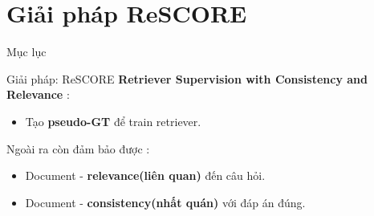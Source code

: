 \documentclass{beamer}
\begin{document}


\section{Giải pháp ReSCORE}
\begin{frame}{Mục lục}
    \tableofcontents[currentsection]
\end{frame}

\begin{frame}{Giải pháp: ReSCORE}
\textbf{Retriever Supervision with Consistency and Relevance} :

\begin{itemize}
    \item Tạo \textbf{pseudo-GT} để train retriever.
\end{itemize}

    Ngoài ra còn đảm bảo được :
    
\begin{itemize}
    \item Document - \textbf{relevance(liên quan)} đến câu hỏi.
    \item Document - \textbf{consistency(nhất quán)} với đáp án đúng.
\end{itemize}

\end{frame}











\end{document}
